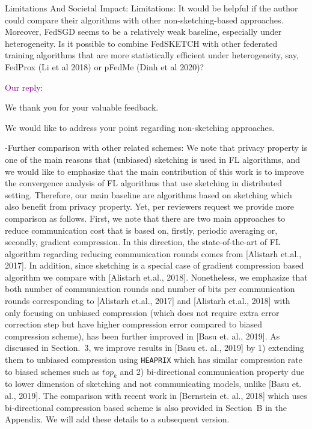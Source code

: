 \documentclass{article}
\begin{document}
Limitations And Societal Impact:
Limitations: It would be helpful if the author could compare their algorithms with other non-sketching-based approaches. Moreover, FedSGD seems to be a relatively weak baseline, especially under heterogeneity. Is it possible to combine FedSKETCH with other federated training algorithms that are more statistically efficient under heterogeneity, say, FedProx (Li et al 2018) or pFedMe (Dinh et al 2020)?

\textcolor{purple}{Our reply:}

We thank you for your valuable feedback.

We would like to address your point regarding non-sketching approaches.

-Further comparison with other related schemes: We note that privacy property is one of the main reasons that (unbiased) sketching is used in FL algorithms, and we would like to emphasize that the main contribution of this work is to improve the convergence analysis of FL algorithms that use sketching in distributed setting. 
Therefore, our main baseline are algorithms based on sketching which also {benefit from privacy property}. 
Yet, per reviewers request we provide more comparison as follows. 
First, we note that there are two main approaches to reduce communication cost that is based on, firstly, periodic averaging or, secondly, gradient compression. In this direction, the state-of-the-art of FL algorithm regarding reducing communication rounds comes from [Alistarh et.al., 2017]. 
In addition, since sketching is a special case of gradient compression based algorithm we compare with [Alistarh et.al., 2018]. 
Nonetheless, we emphasize that both number of communication rounds and number of bits per communication rounds corresponding to [Alistarh et.al., 2017] and [Alistarh et.al., 2018] with only focusing on unbiased compression (which does not require extra error correction step but have higher compression error compared to biased compression scheme), has been further improved in [Basu et. al., 2019]. 
As discussed in Section.~3, we improve results in [Basu et. al., 2019] by 1)  extending them to unbiased compression using \texttt{HEAPRIX} which has similar compression rate to biased schemes such as $top_k$ and 2)  bi-directional communication property due to lower dimension of sketching and not communicating models, unlike [Basu et. al., 2019].  
The comparison with recent work in [Bernstein et. al., 2018] which uses bi-directional compression based scheme is also provided in Section~B in the Appendix. We will add these details to a subsequent version.
\end{document}
